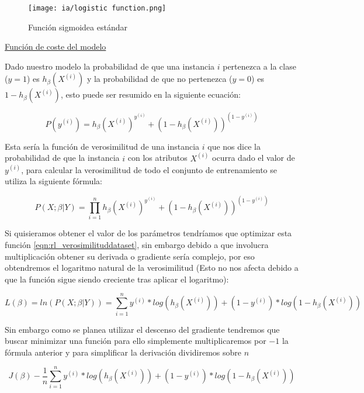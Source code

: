 \documentclass[11pt,fleqn]{book} %
\begin{document}
\begin{figure}[ht]
\centering\texttt{[image: ia/logistic function.png]}
\caption{Función sigmoidea estándar}

\label{fig:sigmoid} 
\end{figure}

\underline{Función de coste del modelo}

Dado nuestro modelo la probabilidad de que una instancia $i$ pertenezca a la clase ($y=1$) es $h_\beta(X^{(i)})$ y la probabilidad de que no pertenezca ($y=0$) es $1-h_\beta(X^{(i)})$, esto puede ser resumido en la siguiente ecuación:

\begin{equation}
P(y^{(i)}) = h_\beta(X^{(i)}) ^ {y^{(i)}} + (1-h_\beta(X^{(i)})) ^ {(1- y^{(i)})}
\label{eqn:probabilidadyrl} 
\end{equation}

Esta sería la función de verosimilitud de una instancia $i$ que nos dice la probabilidad de que la instancia $i$ con los atributos $X^{(i)}$ ocurra dado el valor de $y^{(i)}$, para calcular la verosimilitud de todo el conjunto de entrenamiento se utiliza la siguiente fórmula:

\begin{equation}
P(X;\beta | Y) = \prod_{i=1}^{n} h_\beta(X^{(i)}) ^ {y^{(i)}} + (1-h_\beta(X^{(i)})) ^ {(1- y^{(i)})}
\label{eqn:rl_verosimilituddataset} 
\end{equation}

Si quisieramos obtener el valor de los parámetros tendríamos que optimizar esta función \ref{eqn:rl_verosimilituddataset}, sin embargo debido a que involucra multiplicación obtener su derivada o gradiente sería complejo, por eso obtendremos el logaritmo natural de la verosimilitud (Esto no nos afecta debido a que la función sigue siendo creciente tras aplicar el logaritmo):

\begin{equation}
L(\beta) = ln(P(X;\beta  | Y)) = \sum_{i=1}^{n} y^{(i)}*log(h_\beta(X^{(i)}) ) + (1-y^{(i)})*log(1-h_\beta(X^{(i)}) )
\label{eqn:rl_verosimilituddataset_log} 
\end{equation}

Sin embargo como se planea utilizar el descenso del gradiente tendremos que buscar minimizar una función para ello simplemente multiplicaremos por $-1$ la fórmula anterior y para simplificar la derivación dividiremos sobre $n$

\begin{equation}
J(\beta) -\frac{1}{n} \sum_{i=1}^{n} y^{(i)}*log(h_\beta(X^{(i)}) ) + (1-y^{(i)})*log(1-h_\beta(X^{(i)}) )
\label{eqn:rl_funcioncoste} 
\end{equation}
\end{document}
